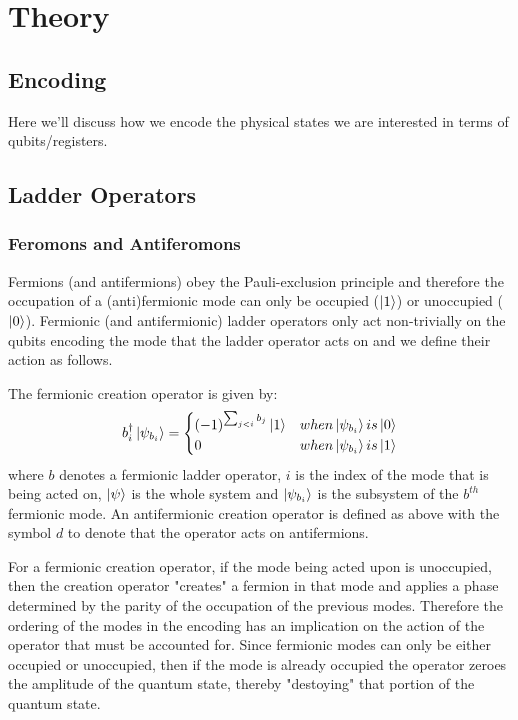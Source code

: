 \section{Theory}

\subsection{Encoding}
\label{subsec:encoding}
Here we'll discuss how we encode the physical states we are interested in terms of qubits/registers.

\subsection{Ladder Operators}
\label{subsec:operators}

\subsubsection{Feromons and Antiferomons}

Fermions (and antifermions) obey the Pauli-exclusion principle  and therefore the occupation of a (anti)fermionic mode can only be occupied ($\ket{1}$) or unoccupied ($\ket{0}$).
Fermionic (and antifermionic) ladder operators only act non-trivially on the qubits encoding the mode that the ladder operator acts on and we define their action as follows.

The fermionic creation operator is given by:
\begin{equation}
    b_i^\dagger \ket{\psi_{b_i}} = 
    \begin{cases} 
        (-1)^{\sum_{j < i} b_j} \ket{1}  & when \ket{\psi_{b_i}} is \ket{0} \\
        0 & when \ket{\psi_{b_i}} is \ket{1}
    \end{cases}
\end{equation}
where $b$ denotes a fermionic ladder operator, $i$ is the index of the mode that is being acted on, $\ket{\psi}$ is the whole system and $\ket{\psi_{b_i}}$ is the subsystem of the $b^{th}$ fermionic mode.
An antifermionic creation operator is defined as above with the symbol $d$ to denote that the operator acts on antifermions.

For a fermionic creation operator, if the mode being acted upon is unoccupied, then the creation operator "creates" a fermion in that mode and applies a phase determined by the parity of the occupation of the previous modes.
Therefore the ordering of the modes in the encoding has an implication on the action of the operator that must be accounted for.
Since fermionic modes can only be either occupied or unoccupied, then if the mode is already occupied the operator zeroes the amplitude of the quantum state, thereby "destoying" that portion of the quantum state. 

